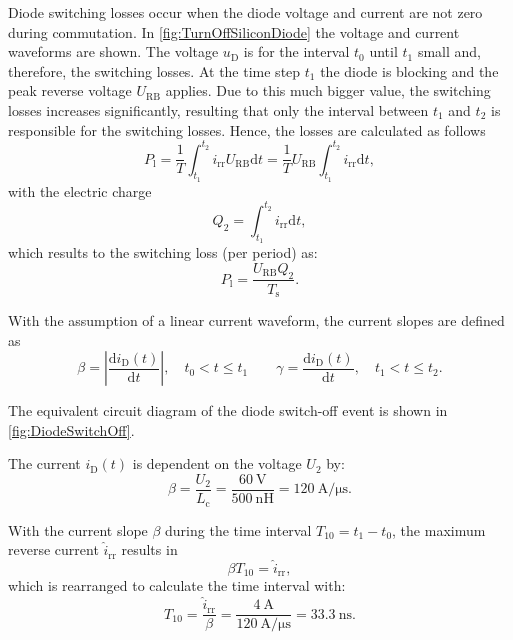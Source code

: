 

\begin{solutionblock}
	Diode switching losses occur when the diode voltage and current are not zero during commutation. In \autoref{fig:TurnOffSiliconDiode} the voltage and current waveforms are shown. The voltage $u_{\mathrm{D}}$ is for the interval $t_0$ until $t_1$ small and, therefore, the switching losses. At the time step $t_1$ the diode is blocking and the peak reverse voltage $U_{\mathrm{RB}}$ applies. Due to this much bigger value, the switching losses increases significantly, resulting that only the interval between $t_1$ and $t_2$ is responsible for the switching losses. Hence, the losses are calculated as follows
	\begin{equation}
		P_{\mathrm{l}} = \frac{1}{T} \int_{t_1}^{t_2} i_{\mathrm{rr}} U_{\mathrm{RB}} \mathrm{d}t = \frac{1}{T} U_{\mathrm{RB}} \int_{t_1}^{t_2} i_{\mathrm{rr}} \mathrm{d}t,
	\end{equation}
	with the electric charge
	\begin{equation}
		Q_2 = \int_{t_1}^{t_2} i_{\mathrm{rr}} \mathrm{d}t,
		\label{eq:chargeQ2}
	\end{equation}
	which results to the switching loss (per period) as:
	\begin{equation}
		P_{\mathrm{l}} = \frac{U_{\mathrm{RB}}Q_2}{T_\mathrm{s}}.
	\end{equation}

	With the assumption of a linear current waveform, the current slopes are defined as
	\begin{equation}
		\beta = \left|\frac{\mathrm{d}i_{\mathrm{D}}(t)}{\mathrm{d}t}\right|, \quad t_0 < t \leq t_1 \qquad \gamma = \frac{\mathrm{d}i_{\mathrm{D}}(t)}{\mathrm{d}t}, \quad t_1 < t \leq t_2.
	\end{equation}

	The equivalent circuit diagram of the diode switch-off event is shown in \autoref{fig:DiodeSwitchOff}.
	
	The current $i_{\mathrm{D}}(t)$ is dependent on the voltage $U_2$ by:
	\begin{equation}
		\beta = \frac{U_2}{L_{\mathrm{c}}} = \frac{\SI{60}{\volt}}{\SI{500}{\nano\henry}} = \SI{120}{\ampere\per\micro\second}.
	\end{equation}

	With the current slope $\beta$ during the time interval $T_{10} = t_1 - t_0$, the maximum reverse current $\hat{i}_{\mathrm{rr}}$ results in
	\begin{equation}
		\beta T_{10} = \hat{i}_{\mathrm{rr}},
	\end{equation}
	which is rearranged to calculate the time interval with:
	\begin{equation}
		T_{10} = \frac{\hat{i}_{\mathrm{rr}}}{\beta} = \frac{\SI{4}{\ampere}}{\SI{120}{\ampere\per\micro\second}} = \SI{33.3}{\nano\second}.
	\end{equation}


\end{solutionblock}

